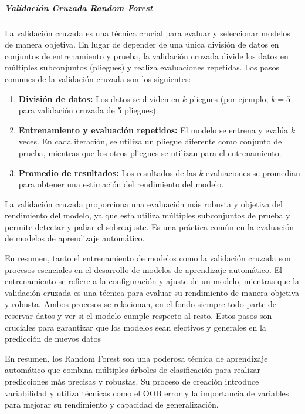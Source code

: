 \subparagraph{Validación Cruzada Random Forest}

La validación cruzada es una técnica crucial para evaluar y seleccionar modelos de manera objetiva. En lugar de depender de una única división de datos en conjuntos de entrenamiento y prueba, la validación cruzada divide los datos en múltiples subconjuntos (pliegues) y realiza evaluaciones repetidas. Los pasos comunes de la validación cruzada son los siguientes:

\begin{enumerate}
  \item \textbf{División de datos:} Los datos se dividen en $k$ pliegues (por ejemplo, $k=5$ para validación cruzada de 5 pliegues).
  
  \item \textbf{Entrenamiento y evaluación repetidos:} El modelo se entrena y evalúa $k$ veces. En cada iteración, se utiliza un pliegue diferente como conjunto de prueba, mientras que los otros pliegues se utilizan para el entrenamiento.
  
  \item \textbf{Promedio de resultados:} Los resultados de las $k$ evaluaciones se promedian para obtener una estimación del rendimiento del modelo.
\end{enumerate}

La validación cruzada proporciona una evaluación más robusta y objetiva del rendimiento del modelo, ya que esta utiliza múltiples subconjuntos de prueba y permite detectar y paliar el sobreajuste. Es una práctica común en la evaluación de modelos de aprendizaje automático.

En resumen, tanto el entrenamiento de modelos como la validación cruzada son procesos esenciales en el desarrollo de modelos de aprendizaje automático. El entrenamiento se refiere a la configuración y ajuste de un modelo, mientras que la validación cruzada es una técnica para evaluar su rendimiento de manera objetiva y robusta. Ambos procesos se relacionan, en el fondo siempre todo parte de reservar datos y ver si el modelo cumple respecto al resto. Estos pasos son cruciales para garantizar que los modelos sean efectivos y generales en la predicción de nuevos datos


\vspace{10pt}

En resumen, los Random Forest son una poderosa técnica de aprendizaje automático que combina múltiples árboles de clasificación para realizar predicciones más precisas y robustas. Su proceso de creación introduce variabilidad y utiliza técnicas como el OOB error y la importancia de variables para mejorar su rendimiento y capacidad de generalización.

